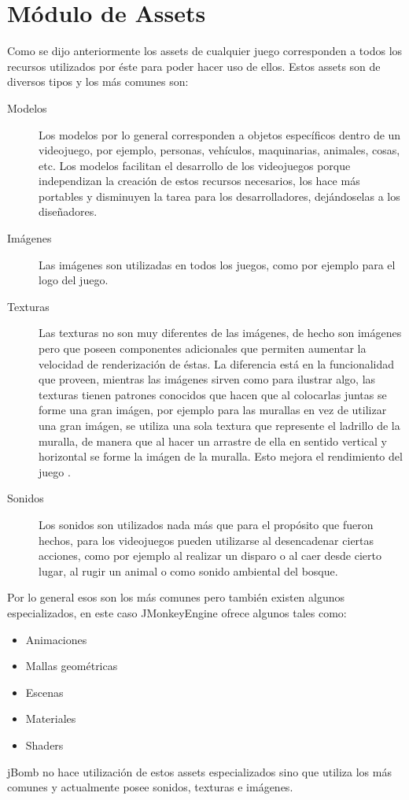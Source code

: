 \documentclass[a4paper,12pt,openany,oneside]{book}
\begin{document}
\section{Módulo de Assets}
Como se dijo anteriormente los assets de cualquier juego corresponden a todos los recursos utilizados por éste para poder hacer uso de ellos. Estos assets son de diversos tipos y los más comunes son:
\begin{description}
\item[Modelos] Los modelos por lo general corresponden a objetos específicos dentro de un videojuego, por ejemplo, personas, vehículos, maquinarias, animales, cosas, etc. Los modelos facilitan el desarrollo de los videojuegos porque independizan la creación de estos recursos necesarios, los hace más portables y disminuyen la tarea para los desarrolladores, dejándoselas a los diseñadores.
\item[Imágenes] Las imágenes son utilizadas en todos los juegos, como por ejemplo para el logo del juego.
\item[Texturas] Las texturas no son muy diferentes de las imágenes, de hecho son imágenes pero que poseen componentes adicionales que permiten aumentar la velocidad de renderización de éstas. La diferencia está en la funcionalidad que proveen, mientras las imágenes sirven como para ilustrar algo, las texturas tienen patrones conocidos que hacen que al colocarlas juntas se forme una gran imágen, por ejemplo para las murallas en vez de utilizar una gran imágen, se utiliza una sola textura que represente el ladrillo de la muralla, de manera que al hacer un arrastre de ella en sentido vertical y horizontal se forme la imágen de la muralla. Esto mejora el rendimiento del juego  \cite{JMONKEY}.
\item[Sonidos] Los sonidos son utilizados nada más que para el propósito que fueron hechos, para los videojuegos pueden utilizarse al desencadenar ciertas acciones, como por ejemplo al realizar un disparo o al caer desde cierto lugar, al rugir un animal o como sonido ambiental del bosque.
\end{description}
Por lo general esos son los más comunes pero también existen algunos especializados, en este caso JMonkeyEngine ofrece algunos tales como:
\begin{itemize}
\item Animaciones
\item Mallas geométricas
\item Escenas
\item Materiales
\item Shaders
\end{itemize}
jBomb no hace utilización de estos assets especializados sino que utiliza los más comunes y actualmente posee sonidos, texturas e imágenes.
\end{document}
